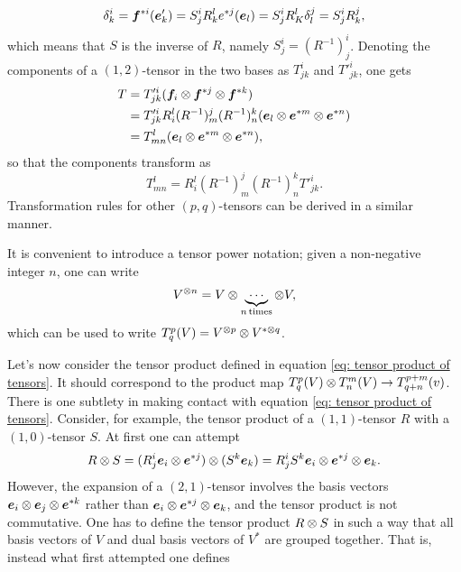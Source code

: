 \begin{equation}
    \delta^i_k = \bm{f}^{*i}(\bm{e}_k') = S^i_jR^l_ke^{*j}(\bm{e}_l) = S^i_jR^l_K\delta^j_l = S^i_jR^j_k,
\end{equation}
which means that $S$ is the inverse of $R$, namely $S^i_j = (R^{-1})^i_j$. Denoting the components of a $(1,2)$-tensor in the two bases as $T^i_{jk}$ and $T'^{i}_{jk}$, one gets
\begin{equation}
    \begin{split}
        T &= T'^i_{jk}(\bm{f}_i \otimes \bm{f}^{*j} \otimes \bm{f}^{*k}) \\
        &= T'^i_{jk}R^l_i(R^{-1})^j_m(R^{-1})^k_n(\bm{e}_l \otimes \bm{e}^{*m} \otimes \bm{e}^{*n}) \\
        &= T^l_{mn}(\bm{e}_l \otimes \bm{e}^{*m} \otimes \bm{e}^{*n}),
    \end{split}
\end{equation}
so that the components transform as
\begin{equation}
    T^l_{mn} = R^l_i(R^{-1})^j_m(R^{-1})^k_nT'^i_{jk}.
\end{equation}
Transformation rules for other $(p,q)$-tensors can be derived in a similar manner. 
\begin{notz}
    It is convenient to introduce a tensor power notation; given a non-negative integer $n$, one can write
    \begin{equation}
        V^{\otimes n} = V \otimes \underbrace{\cdots}_{n\,\mathrm{times}} \otimes V,
    \end{equation}
    which can be used to write $T^p_q(V) = V^{\otimes p} \otimes V^{*\otimes q}$.
\end{notz}
Let's now consider the tensor product defined in equation \eqref{eq: tensor product of tensors}. It should correspond to the product map $T^p_q(V) \otimes T^m_n(V) \to T^{p + m}_{q + n}(v)$. There is one subtlety in making contact with equation \eqref{eq: tensor product of tensors}. Consider, for example, the tensor product of a $(1,1)$-tensor $R$ with a $(1,0)$-tensor $S$. At first one can attempt 
\begin{equation}
    R \otimes S = (R^i_j\bm{e}_i \otimes \bm{e}^{*j}) \otimes (S^k\bm{e}_k) = R^i_jS^k\bm{e}_i \otimes \bm{e}^{*j} \otimes \bm{e}_k.
\end{equation}
However, the expansion of a $(2,1)$-tensor involves the basis vectors $\bm{e}_i \otimes \bm{e}_j \otimes \bm{e}^{*k}$ rather than $\bm{e}_i \otimes \bm{e}^{*j} \otimes \bm{e}_k$, and the tensor product is not commutative. One has to define the tensor product $R \otimes S$ in such a way that all basis vectors of $V$ and dual basis vectors of $V^*$ are grouped together. That is, instead what first attempted one defines
